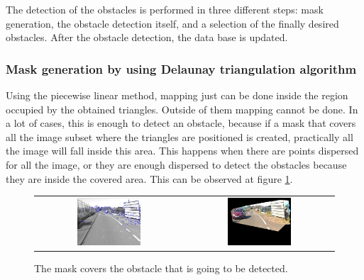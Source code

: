 The detection of the obstacles is performed in three different steps: mask generation, the obstacle detection itself, and a selection of the finally desired obstacles. After the obstacle detection, the data base is updated.

\subsubsection{Mask generation by using Delaunay triangulation algorithm}\label{ch:chapter01_01_03_01}

Using the piecewise linear method, mapping just can be done inside the region occupied by the obtained triangles. Outside of them mapping cannot be done. In a lot of cases, this is enough to detect an obstacle, because if a mask that covers all the image subset where the triangles are positioned is created, practically all the image will fall inside this area. This happens when there are points dispersed for all the image, or they are enough dispersed to detect the obstacles because they are inside the covered area. This can be observed at figure \ref{fig:cp01_mask_is_covering}.

\begin{figure}[h!]
\centering
\begin{tabular}{cc}
\includegraphics[width=0.45\textwidth]{maskCovers1}\label{fig:cp01_mask_is_covering_1} &
\includegraphics[width=0.45\textwidth]{maskCovers2}\label{fig:cp01_mask_is_covering_2}
\end{tabular}
\caption{The mask covers the obstacle that is going to be detected.}\label{fig:cp01_mask_is_covering}
\end{figure}

